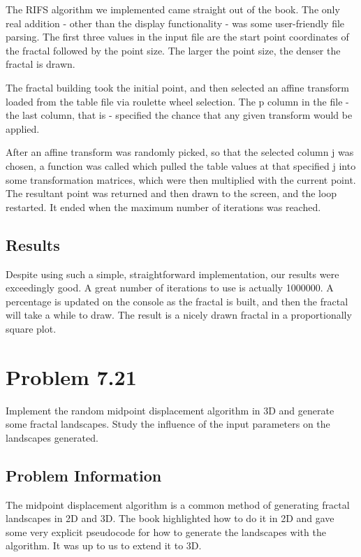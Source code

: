 The RIFS algorithm we implemented came straight out of the book.  The only real addition - other than the display functionality - was some user-friendly file parsing.  The first three values in the input file are the start point coordinates of the fractal followed by the point size.  The larger the point size, the denser the fractal is drawn.

The fractal building took the initial point, and then selected an affine transform loaded from the table file via roulette wheel selection.  The p column in the file - the last column, that is - specified the chance that any given transform would be applied.

After an affine transform was randomly picked, so that the selected column j was chosen, a function was called which pulled the table values at that specified j into some transformation matrices, which were then multiplied with the current point.  The resultant point was returned and then drawn to the screen, and the loop restarted.  It ended when the maximum number of iterations was reached.

\subsection{Results}

Despite using such a simple, straightforward implementation, our results were exceedingly good.  A great number of iterations to use is actually 1000000.   A percentage is updated on the console as the fractal is built, and then the fractal will take a while to draw.  The result is a nicely drawn fractal in a proportionally square plot.





\section{Problem 7.21}

Implement the random midpoint displacement algorithm in 3D and generate some fractal landscapes.  Study the influence of the input parameters on the landscapes generated.

\subsection{Problem Information}

The midpoint displacement algorithm is a common method of generating fractal landscapes in 2D and 3D.  The book highlighted how to do it in 2D and gave some very explicit pseudocode for how to generate the landscapes with the algorithm.  It was up to us to extend it to 3D.


